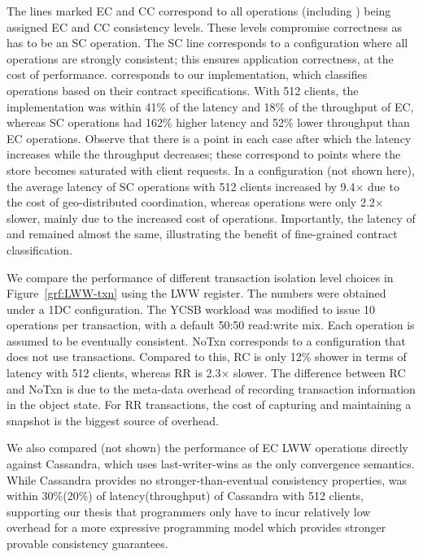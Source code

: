 The lines marked EC and CC correspond to all operations (including
) being assigned EC and CC consistency levels. These levels
compromise correctness as  has to be an SC operation. The SC line
corresponds to a configuration where all operations are strongly consistent;
this ensures application correctness, at the cost of performance. \name
corresponds to our implementation, which classifies operations based on their
contract specifications. With 512 clients, the \name implementation was within
41\% of the latency and 18\% of the throughput of EC, whereas SC operations had
162\% higher latency and 52\% lower throughput than EC operations. Observe that
there is a point in each case after which the latency increases while the
throughput decreases; these correspond to points where the store becomes
saturated with client requests. In a  configuration (not shown here),
the average latency of SC operations with 512 clients increased by 9.4$\times$
due to the cost of geo-distributed coordination, whereas \name operations were
only 2.2$\times$ slower, mainly due to the increased cost of 
operations. Importantly, the latency of  and 
remained almost the same, illustrating the benefit of fine-grained contract
classification.

We compare the performance of different transaction isolation level choices in
Figure~\ref{grf:LWW-txn} using the LWW register. The numbers were obtained
under a 1DC configuration. The YCSB workload was modified to issue 10
operations per transaction, with a default 50:50 read:write mix. Each operation
is assumed to be eventually consistent. NoTxn corresponds to a configuration
that does not use transactions. Compared to this, RC is only 12\% shower in
terms of latency with 512 clients, whereas RR is 2.3$\times$ slower. The
difference between RC and NoTxn is due to the meta-data overhead of recording
transaction information in the object state. For RR transactions, the cost of
capturing and maintaining a snapshot is the biggest source of overhead.

We also compared (not shown) the performance of EC LWW operations directly
against Cassandra, which uses last-writer-wins as the only convergence
semantics. While Cassandra provides no stronger-than-eventual consistency
properties, \name was within 30\%(20\%) of latency(throughput) of Cassandra
with 512 clients, supporting our thesis that programmers only have to incur
relatively low overhead for a more expressive programming model which provides
stronger provable consistency guarantees.

